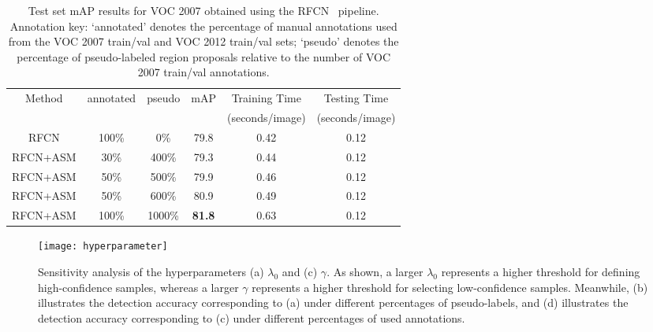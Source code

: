 \documentclass[journal]{IEEEtran}
\begin{document}
{\begin{table}[t]
\footnotesize
\center
\setlength{\tabcolsep}{2pt}
\caption{{Test set mAP results for VOC 2007 obtained using the RFCN~\cite{rfcn16NIPS} pipeline. Annotation key: `annotated' denotes the percentage of manual annotations used from the VOC 2007 train/val and VOC 2012 train/val sets; `pseudo' denotes the percentage of pseudo-labeled region proposals relative to the number of VOC 2007 train/val annotations.}}\label{tab:time}
\vspace{-8pt}
{\begin{tabular}{c |c  c | c | c c}
\hline
\hline
Method & annotated & pseudo & mAP & Training Time & Testing Time \\
& & & & (seconds/image) & (seconds/image) \\
\hline
RFCN & 100\% & 0\% & 79.8 & 0.42 & 0.12  \\
RFCN+{ASM} & 30\% & 400\% & 79.3 & 0.44 & 0.12 \\
RFCN+{ASM} & 50\% & 500\% & 79.9 & 0.46 & 0.12 \\
RFCN+{ASM} & 50\% & 600\% & 80.9 & 0.49 & 0.12 \\
RFCN+{ASM} & 100\% & 1000\% &\bf 81.8 & 0.63 & 0.12 \\
\hline
\hline
\end{tabular}}
\vspace{-10pt}
\end{table}





\begin{figure*}[tbp]
\center
\texttt{[image: hyperparameter]}
\vspace{-10pt}
\caption{{Sensitivity analysis of the hyperparameters (a) $\lambda_0$ and (c) $\gamma$. As shown, a larger $\lambda_0$ represents a higher threshold for defining high-confidence samples, whereas a larger $\gamma$ represents a higher threshold for selecting low-confidence samples. Meanwhile, (b) illustrates the detection accuracy corresponding to (a) under different percentages of pseudo-labels, and (d) illustrates the detection accuracy corresponding to (c) under different percentages of used annotations.} }\label{fig:hyper}
\vspace{-10pt}
\end{figure*}



}
\end{document}
